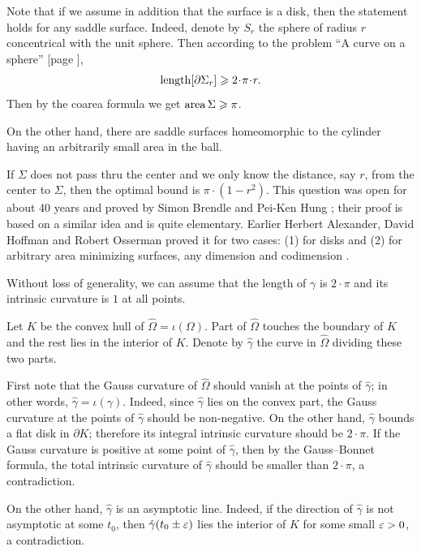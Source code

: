Note that if we assume in addition that the surface is a disk,
then the statement holds for any saddle surface. 
Indeed, denote by $S_r$ the sphere of radius $r$ concentrical with the unit sphere. 
Then according to the problem ``A curve on a sphere'' [page \pageref{A curve in a sphere}], 
\[\length[\partial\Sigma_r]\ge 2\cdot\pi\cdot r.\]
Then by the coarea formula we get $\operatorname{\rm area}\nolimits\Sigma\geqslant \pi$.

On the other hand, there are saddle surfaces homeomorphic to the cylinder
having an arbitrarily small area in the ball. 

If $\Sigma$ does not pass thru the center 
and we only know the distance, say $r$, 
from the center to $\Sigma$,
then the optimal bound is $\pi\cdot(1-r^2)$.
This question was open for about 40 years and proved by Simon Brendle and Pei-Ken Hung \cite{brende-hung};
their proof is based on a similar idea and is quite elementary.
Earlier Herbert Alexander, 
David Hoffman
and Robert Osserman 
proved it for two cases: (1) for disks and (2) for arbitrary area minimizing surfaces, any dimension and codimension
 \cite{alexander-osserman,alexander-hoffman-osserman}.






Without loss of generality, we can assume that the length of $\gamma$ is $2{\cdot}\pi$ and its intrinsic curvature is $1$ at all points.

Let $K$ be the convex hull of $\hat\Omega=\iota(\Omega)$.
Part of $\hat\Omega$ touches the boundary of $K$ and the rest lies in the interior of $K$. 
Denote by $\hat\gamma$ the curve in $\hat\Omega$ dividing these two parts.

First note that the Gauss curvature of $\hat\Omega$ should vanish at the points of $\hat\gamma$;
in other words, $\hat\gamma=\iota(\gamma)$.
Indeed, since $\hat\gamma$ lies on the convex part, 
the Gauss curvature at the points of $\hat\gamma$ should be non-negative. 
On the other hand, $\hat\gamma$ bounds a flat disk in $\partial K$;
therefore its integral intrinsic curvature should be $2{\cdot}\pi$.
If the Gauss curvature is positive at some point of $\hat\gamma$, 
then by the Gauss--Bonnet formula, the total intrinsic curvature of $\hat\gamma$ should be smaller than $2{\cdot}\pi$, a contradiction.

On the other hand, $\hat\gamma$ is an asymptotic line.
Indeed, if the direction of $\hat\gamma$ is not asymptotic at some $t_0$,
then $\hat\gamma(t_0 \pm\varepsilon)$ lies the interior of $K$ for some small $\varepsilon>0$, a contradiction.

